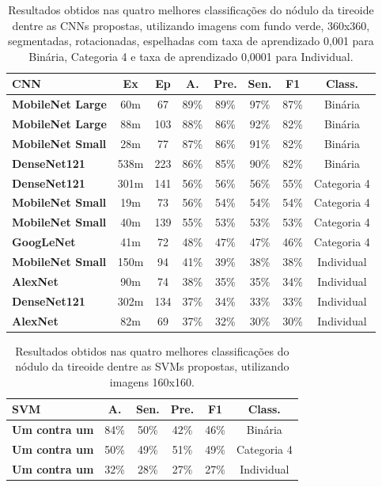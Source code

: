 \documentclass[12pt]{article}
\begin{document}
\begin{table}[H]
\centering
\caption{\textmd{Resultados obtidos nas quatro melhores classificações do nódulo da tireoide dentre as CNNs propostas, utilizando imagens com fundo verde, 360x360, segmentadas, rotacionadas, espelhadas com taxa de aprendizado 0,001 para Binária, Categoria 4 e taxa de aprendizado 0,0001 para Individual. }\\}\label{table:binary}
\begin{tabular}{lccccccc}
\toprule
 {CNN} & {Ex} & {Ep} & {A.} & {Pre.} & {Sen.} & {F1} & {Class.} \\
\midrule
\textbf{MobileNet Large} & 60m & 67 & 89\% & 89\% & 97\% & 87\% & Binária \\
\midrule
\textbf{MobileNet Large} & 88m & 103 & 88\% & 86\% & 92\% & 82\% & Binária \\
\midrule
\textbf{MobileNet Small} & 28m & 77 & 87\% & 86\% & 91\% & 82\% & Binária \\
\midrule
\textbf{DenseNet121}     & 538m & 223& 86\% & 85\% & 90\% & 82\% & Binária \\
\midrule
\midrule
\textbf{DenseNet121}     & 301m & 141 & 56\% & 56\% & 56\% & 55\% & Categoria 4 \\
\midrule
\textbf{MobileNet Small} & 19m & 73 & 56\% & 54\% & 54\% & 54\% & Categoria 4 \\
\midrule
\textbf{MobileNet Small} & 40m & 139 & 55\% & 53\% & 53\% & 53\% & Categoria 4 \\
\midrule
\textbf{GoogLeNet}       & 41m & 72 & 48\% & 47\% & 47\% & 46\% & Categoria 4 \\
\midrule
\midrule
\textbf{MobileNet Small} & 150m & 94 & 41\% & 39\% & 38\% & 38\% & Individual \\
\midrule
\textbf{AlexNet}         & 90m & 74 & 38\% & 35\% & 35\% & 34\% & Individual \\
\midrule
\textbf{DenseNet121}     & 302m & 134 & 37\% & 34\% & 33\% & 33\% & Individual \\
\midrule
\textbf{AlexNet}         & 82m & 69 & 37\% & 32\% & 30\% & 30\% & Individual \\
\bottomrule
\end{tabular}
\label{tab:cnn}
\end{table}

\begin{table}[h]
\centering
\caption{\textmd{Resultados obtidos nas quatro melhores classificações do nódulo da tireoide dentre as SVMs propostas, utilizando imagens 160x160.}\\}\label{table:binary}
\begin{tabular}{lccccc}
\toprule
 {SVM} & {A.} & {Sen.} & {Pre.} & {F1} & {Class.} \\
\midrule
\textbf{Um contra um} & 84\% & 50\% & 42\% & 46\% & Binária \\
\midrule
\textbf{Um contra um} & 50\% & 49\% & 51\% & 49\% & Categoria 4 \\
\midrule
\textbf{Um contra um} & 32\% & 28\% & 27\% & 27\% & Individual \\
\bottomrule
\end{tabular}
\label{tab:svm}
\end{table}
\end{document}
